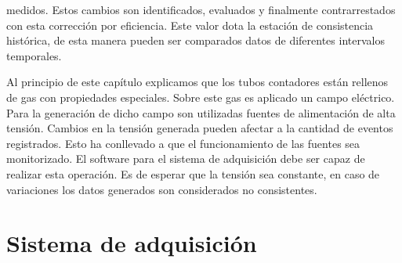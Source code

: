         medidos. Estos cambios son identificados, evaluados y finalmente
        contrarrestados con esta corrección por eficiencia. Este valor dota la
        estación de consistencia histórica, de esta manera pueden ser comparados
        datos de diferentes intervalos temporales.
        \par
        Al principio de este capítulo explicamos que los tubos contadores están
        rellenos de gas con propiedades especiales. Sobre este gas es aplicado un
        campo eléctrico. Para la generación de dicho campo son utilizadas fuentes
        de alimentación de alta tensión. Cambios en la tensión generada pueden
        afectar a la cantidad de eventos registrados. Esto ha conllevado a que el
        funcionamiento de las fuentes sea monitorizado. El software para el sistema
        de adquisición debe ser capaz de realizar esta operación. Es de esperar que
        la tensión sea constante, en caso de variaciones los datos generados son
        considerados no consistentes.








\chapter{Sistema de adquisición}
\label{cap2}
